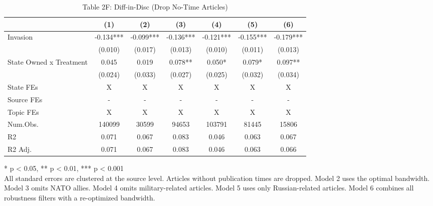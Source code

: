 \begin{table}[!t]
\caption{Table 2F: Diff-in-Disc (Drop No-Time Articles)} 
\fontsize{12.0pt}{14.4pt}\selectfont
\begin{tabular*}{\linewidth}{@{\extracolsep{\fill}}lcccccc}
\toprule
  & (1) & (2) & (3) & (4) & (5) & (6) \\ 
\midrule\addlinespace[2.5pt]
Invasion & -0.134*** & -0.099*** & -0.136*** & -0.121*** & -0.155*** & -0.179*** \\ 
 & (0.010) & (0.017) & (0.013) & (0.010) & (0.011) & (0.013) \\ 
State Owned x Treatment & 0.045 & 0.019 & 0.078** & 0.050* & 0.079* & 0.097** \\ 
{} & {(0.024)} & {(0.033)} & {(0.027)} & {(0.025)} & {(0.032)} & {(0.034)} \\ 
State FEs & X & X & X & X & X & X \\ 
Source FEs & - & - & - & - & - & - \\ 
Topic FEs & X & X & X & X & X & X \\ 
Num.Obs. & 140099 & 30599 & 94653 & 103791 & 81445 & 15806 \\ 
R2 & 0.071 & 0.067 & 0.083 & 0.046 & 0.063 & 0.067 \\ 
R2 Adj. & 0.071 & 0.067 & 0.083 & 0.046 & 0.063 & 0.066 \\ 
\bottomrule
\end{tabular*}
\begin{minipage}{\linewidth}
* p < 0.05, ** p < 0.01, *** p < 0.001\\
All standard errors are clustered at the source level. Articles without
publication times are dropped. Model 2 uses the optimal bandwidth. Model
3 omits NATO allies. Model 4 omits military-related articles. Model 5 uses
only Russian-related articles. Model 6 combines all robustness filters with a
re-optimized bandwidth.\\
\end{minipage}
\end{table}

